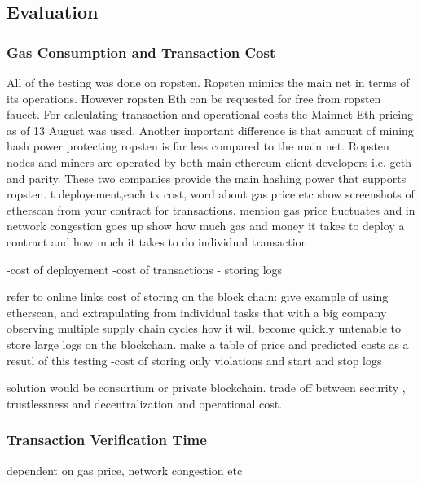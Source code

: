 \subsection{Evaluation}
\subsubsection{Gas Consumption and Transaction Cost} \label{TrxCost} 
All of the testing was done on ropsten.  Ropsten mimics the main net in terms of its operations.  However ropsten Eth can be requested for free from ropsten faucet.  For calculating transaction and operational costs the Mainnet Eth pricing as of 13 August was used. Another important difference is that amount of mining hash power protecting ropsten is far less compared to the main net. Ropsten nodes and miners are operated by both main ethereum client developers i.e. geth and parity. These two companies provide the main hashing power that supports ropsten. t
deployement,each tx cost, word about gas price etc
show screenshots of etherscan from your contract for transactions.
mention gas price fluctuates and in network congestion goes up
show how much gas and money it takes to deploy a contract
and how much it takes to do individual transaction

-cost of deployement
-cost of transactions - storing logs

refer to online links cost of storing on the block chain: give example of using etherscan, and extrapulating from individual tasks that with a big company observing multiple supply chain cycles how it will become quickly untenable to store large logs on the blockchain. make a table of price and predicted costs as a resutl of this testing
-cost of storing only violations and start and stop logs

solution would be consurtium or private blockchain. trade off between security , trustlessness and decentralization and operational cost.

\subsubsection{Transaction Verification Time}
dependent on gas price, network congestion etc